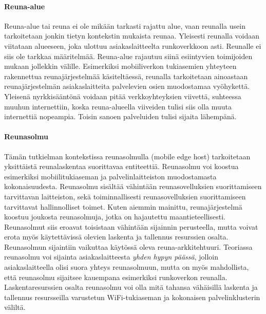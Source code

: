 \paragraph{Reuna-alue} 
Reuna-alue tai reuna ei ole mikään tarkasti rajattu alue, vaan reunalla usein tarkoitetaan jonkin tietyn kontekstin mukaista reunaa. 
Yleisesti reunalla voidaan viitataan alueeseen, joka ulottuu asiakaslaitteelta runkoverkkoon asti. Reunalle ei siis ole tarkkaa määritelmää.
Reuna-alue rajautuu siinä esiintyvien toimijoiden mukaan jollekkin välille. 
Esimerkiksi mobiiliverkon tukiasemien yhteyteen rakennettua reunajärjestelmää käsiteltäessä, reunalla tarkoitetaan ainoastaan reunajärjestelmän asiakaslaitteita palvelevien osien muodostamaa vyöhykettä. 
Yleisenä nyrkkisääntönä voidaan pitää verkkoyhteyksien viivettä, suhteessa muuhun internettiin, koska reuna-alueella viiveiden tulisi siis olla muuta internettiä nopeampia. Toisin sanoen palveluiden tulisi sijaita lähempänä.


\paragraph{Reunasolmu} 
Tämän tutkielman kontekstissa reunasolmulla (mobile edge host) tarkoitetaan yksittäistä reunalaskentaa suorittavaa entiteettiä. Reunasolmu voi koostua esimerkiksi mobiilitukiaseman ja palvelinlaitteiston muodostamasta kokonaisuudesta. Reunasolmu sisältää vähintään reunasovelluksien suorittamiseen tarvittavan laitteiston, sekä toiminnallisesti reunasovelluksien suorittamiseen tarvittavat hallinnolliset toimet. 
Kuten aiemmin mainittu, reunajärjestelmä koostuu joukosta reunasolmuja, jotka on hajautettu maantieteellisesti.
Reunasolmut siis eroavat toisistaan vähintään sijainnin perusteella, mutta voivat erota myös käytettävissä olevien laskenta ja tallennus resurssien osalta.
Reunasolmun sijaintiin vaikuttaa käytössä oleva reuna-arkkitehtuuri.
Teoriassa reunasolmu voi sijainta asiakaslaitteesta \textit{yhden hypyn päässä}, jolloin asiakaslaitteella olisi suora yhteys reunasolmuun, mutta on myös mahdollista, että reunasolmu sijaitsee kauempana esimerkiksi runkoverkon reunalla. 
Laskentaresurssien osalta reunasolmu voi olla mitä tahansa vähäisillä laskenta ja tallennus resursseilla varustetun WiFi-tukiaseman ja kokonaisen palvelinklusterin väliltä. 

